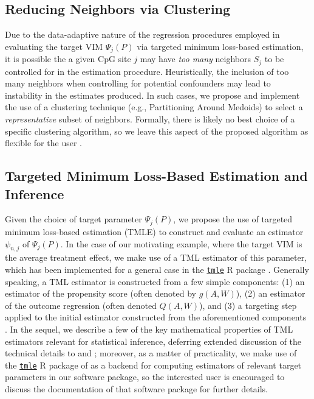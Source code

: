 \documentclass[9pt,a4paper,]{extarticle}
\theoremstyle{definition}
\theoremstyle{definition}
\theoremstyle{definition}
\theoremstyle{remark}
\begin{document}
\hypertarget{reducing-neighbors-via-clustering}{%
\subsection{Reducing Neighbors via Clustering}\label{reducing-neighbors-via-clustering}}

Due to the data-adaptive nature of the regression procedures employed in
evaluating the target VIM \(\Psi_j(P)\) via targeted minimum loss-based
estimation, it is possible the a given CpG site \(j\) may have \emph{too many}
neighbors \(S_j\) to be controlled for in the estimation procedure. Heuristically,
the inclusion of too many neighbors when controlling for potential confounders
may lead to instability in the estimates produced. In such cases, we propose and
implement the use of a clustering technique (e.g., Partitioning Around Medoids)
to select a \emph{representative} subset of neighbors. Formally, there is likely no
best choice of a specific clustering algorithm, so we leave this aspect of the
proposed algorithm as flexible for the user \citep{kleinberg2003impossibility}.

\hypertarget{targeted-minimum-loss-based-estimation-and-inference}{%
\subsection{Targeted Minimum Loss-Based Estimation and Inference}\label{targeted-minimum-loss-based-estimation-and-inference}}

Given the choice of target parameter \(\Psi_j(P)\), we propose the use of targeted
minimum loss-based estimation (TMLE) to construct and evaluate an estimator
\(\psi_{n, j}\) of \(\Psi_j(P)\). In the case of our motivating example, where the
target VIM is the average treatment effect, we make use of a TML estimator of
this parameter, which has been implemented for a general case in the
\href{https://CRAN.R-project.org/package=tmle}{\texttt{tmle}} R package \citep{gruber2011tmle}.
Generally speaking, a TML estimator is constructed from a few simple components:
(1) an estimator of the propensity score \citep{rosenbaum1983central} (often denoted
by \(g(A, W)\)), (2) an estimator of the outcome regression (often denoted \(Q(A, W)\)), and (3) a targeting step applied to the initial estimator constructed from
the aforementioned components \citep{gruber2009targeted}. In the sequel, we describe
a few of the key mathematical properties of TML estimators relevant for
statistical inference, deferring extended discussion of the technical details to
\citet{vdl2011targeted} and \citet{vdl2018targeted}; moreover, as a matter of practicality, we
make use of the \href{https://CRAN.R-project.org/package=tmle}{\texttt{tmle}} R package of
\citet{gruber2011tmle} as a backend for computing estimators of relevant target
parameters in our software package, so the interested user is encouraged to
discuss the documentation of that software package for further details.
\end{document}
